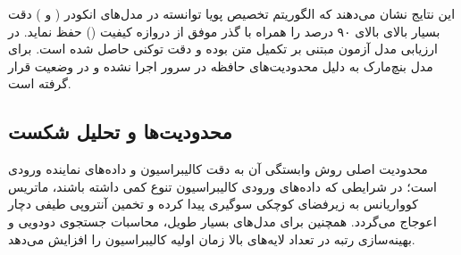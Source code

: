 این نتایج نشان می‌دهند که الگوریتم تخصیص پویا توانسته در مدل‌های انکودر ( و ) دقت بسیار بالای بالای ۹۰ درصد را همراه با گذر موفق از دروازه کیفیت () حفظ نماید. در ارزیابی مدل  آزمون مبتنی بر تکمیل متن بوده و دقت توکنی  حاصل شده است. برای مدل  بنچ‌مارک به دلیل محدودیت‌های حافظه در سرور اجرا نشده و در وضعیت  قرار گرفته است.

\subsection{محدودیت‌ها و تحلیل شکست}
محدودیت اصلی روش  وابستگی آن به دقت کالیبراسیون و داده‌های نماینده ورودی است؛ در شرایطی که داده‌های ورودی کالیبراسیون تنوع کمی داشته باشند، ماتریس کوواریانس به زیرفضای کوچکی سوگیری پیدا کرده و تخمین آنتروپی طیفی دچار اعوجاج می‌گردد. همچنین برای مدل‌های بسیار طویل، محاسبات جستجوی دودویی و بهینه‌سازی رتبه در تعداد لایه‌های بالا زمان اولیه کالیبراسیون را افزایش می‌دهد.

